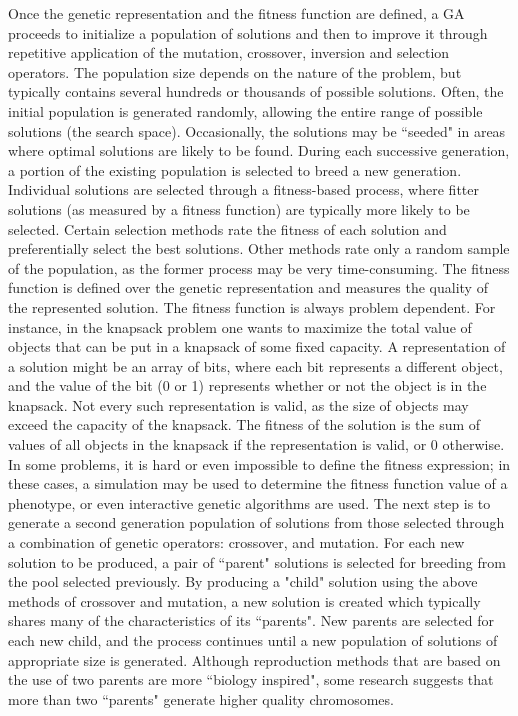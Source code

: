 Once the genetic representation and the fitness function are defined, a GA proceeds to initialize a population of solutions and then to improve it through repetitive application of the mutation, crossover, inversion and selection operators.
The population size depends on the nature of the problem, but typically contains several hundreds or thousands of possible solutions. Often, the initial population is generated randomly, allowing the entire range of possible solutions (the search space). Occasionally, the solutions may be ``seeded" in areas where optimal solutions are likely to be found.
During each successive generation, a portion of the existing population is selected to breed a new generation. Individual solutions are selected through a fitness-based process, where fitter solutions (as measured by a fitness function) are typically more likely to be selected. Certain selection methods rate the fitness of each solution and preferentially select the best solutions. Other methods rate only a random sample of the population, as the former process may be very time-consuming.
The fitness function is defined over the genetic representation and measures the quality of the represented solution. The fitness function is always problem dependent. For instance, in the knapsack problem one wants to maximize the total value of objects that can be put in a knapsack of some fixed capacity. A representation of a solution might be an array of bits, where each bit represents a different object, and the value of the bit (0 or 1) represents whether or not the object is in the knapsack. Not every such representation is valid, as the size of objects may exceed the capacity of the knapsack. The fitness of the solution is the sum of values of all objects in the knapsack if the representation is valid, or $0$ otherwise.
In some problems, it is hard or even impossible to define the fitness expression; in these cases, a simulation may be used to determine the fitness function value of a phenotype, or even interactive genetic algorithms are used.
The next step is to generate a second generation population of solutions from those selected through a combination of genetic operators: crossover, and mutation.
For each new solution to be produced, a pair of ``parent" solutions is selected for breeding from the pool selected previously. By producing a "child" solution using the above methods of crossover and mutation, a new solution is created which typically shares many of the characteristics of its ``parents". New parents are selected for each new child, and the process continues until a new population of solutions of appropriate size is generated. Although reproduction methods that are based on the use of two parents are more ``biology inspired", some research suggests that more than two ``parents" generate higher quality chromosomes.
